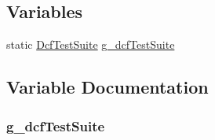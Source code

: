 \subsection*{Variables}
\begin{DoxyCompactItemize}
\item 
static \hyperlink{classDcfTestSuite}{Dcf\+Test\+Suite} \hyperlink{dcf-manager-test_8cc_aab40709a9656b58f9af94ec940eda986}{g\+\_\+dcf\+Test\+Suite}
\end{DoxyCompactItemize}


\subsection{Variable Documentation}
\subsubsection[{\texorpdfstring{g\+\_\+dcf\+Test\+Suite}{g_dcfTestSuite}}]{ g\+\_\+dcf\+Test\+Suite\hspace{0.3cm}{\ttfamily [static]}}\hypertarget{dcf-manager-test_8cc_aab40709a9656b58f9af94ec940eda986}{}\label{dcf-manager-test_8cc_aab40709a9656b58f9af94ec940eda986}
